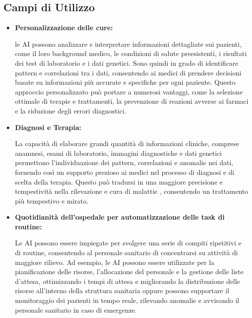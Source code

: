 \subsection{Campi di Utilizzo}

\begin{itemize}
    \item \textbf{Personalizzazione delle cure:}

    
    le AI possono analizzare e interpretare informazioni dettagliate sui pazienti, come il loro background medico, le condizioni di salute preesistenti, i risultati dei test di laboratorio e i dati genetici.
    Sono quindi in grado di identificare pattern e correlazioni tra i dati, consentendo ai medici di prendere decisioni basate su informazioni più accurate e specifiche per ogni paziente. Questo approccio personalizzato può portare a numerosi vantaggi, come la selezione ottimale di terapie e trattamenti, la prevenzione di reazioni avverse ai farmaci e la riduzione degli errori diagnostici.
    \item \textbf{Diagnosi e Terapia:}

    
     La capacità di elaborare grandi quantità di informazioni cliniche, comprese anamnesi, esami di laboratorio, immagini diagnostiche e dati genetici permettono l'individuazione dei pattern, correlazioni e anomalie nei dati, fornendo così un supporto prezioso ai medici nel processo di diagnosi e di scelta della terapia. Questo può tradursi in una maggiore precisione e tempestività nella rilevazione e cura di malattie , consentendo un trattamento più tempestivo e mirato.
     
    \item \textbf{Quotidianità dell'ospedale per automatizzazione delle task di routine:}

     Le AI possono essere impiegate per svolgere una serie di compiti ripetitivi e di routine, consentendo al personale sanitario di concentrarsi su attività di maggiore rilievo. 
     Ad esempio, le AI possono essere utilizzate per  la pianificazione delle risorse, l'allocazione del personale e la gestione delle liste d'attesa, ottimizzando i tempi di attesa e migliorando la distribuzione delle risorse all'interno della struttura sanitaria oppure possono supportare il monitoraggio dei pazienti in tempo reale, rilevando anomalie e avvisando il personale sanitario in caso di emergenze.

\end{itemize}

 
